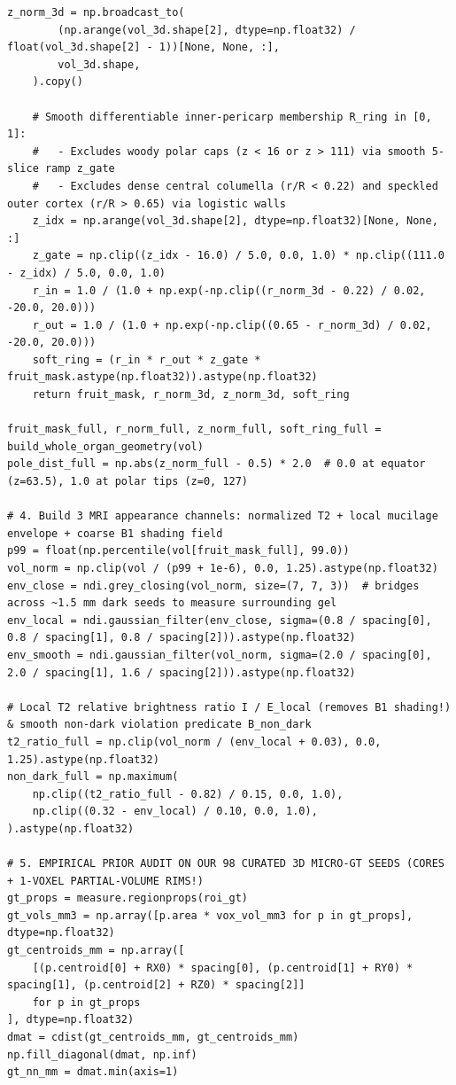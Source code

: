 \documentclass[10pt,a4paper]{article}
\begin{document}
\begin{codebox}
\begin{lstlisting}[style=pybmed]
    z_norm_3d = np.broadcast_to(
        (np.arange(vol_3d.shape[2], dtype=np.float32) / float(vol_3d.shape[2] - 1))[None, None, :],
        vol_3d.shape,
    ).copy()

    # Smooth differentiable inner-pericarp membership R_ring in [0, 1]:
    #   - Excludes woody polar caps (z < 16 or z > 111) via smooth 5-slice ramp z_gate
    #   - Excludes dense central columella (r/R < 0.22) and speckled outer cortex (r/R > 0.65) via logistic walls
    z_idx = np.arange(vol_3d.shape[2], dtype=np.float32)[None, None, :]
    z_gate = np.clip((z_idx - 16.0) / 5.0, 0.0, 1.0) * np.clip((111.0 - z_idx) / 5.0, 0.0, 1.0)
    r_in = 1.0 / (1.0 + np.exp(-np.clip((r_norm_3d - 0.22) / 0.02, -20.0, 20.0)))
    r_out = 1.0 / (1.0 + np.exp(-np.clip((0.65 - r_norm_3d) / 0.02, -20.0, 20.0)))
    soft_ring = (r_in * r_out * z_gate * fruit_mask.astype(np.float32)).astype(np.float32)
    return fruit_mask, r_norm_3d, z_norm_3d, soft_ring

fruit_mask_full, r_norm_full, z_norm_full, soft_ring_full = build_whole_organ_geometry(vol)
pole_dist_full = np.abs(z_norm_full - 0.5) * 2.0  # 0.0 at equator (z=63.5), 1.0 at polar tips (z=0, 127)

# 4. Build 3 MRI appearance channels: normalized T2 + local mucilage envelope + coarse B1 shading field
p99 = float(np.percentile(vol[fruit_mask_full], 99.0))
vol_norm = np.clip(vol / (p99 + 1e-6), 0.0, 1.25).astype(np.float32)
env_close = ndi.grey_closing(vol_norm, size=(7, 7, 3))  # bridges across ~1.5 mm dark seeds to measure surrounding gel
env_local = ndi.gaussian_filter(env_close, sigma=(0.8 / spacing[0], 0.8 / spacing[1], 0.8 / spacing[2])).astype(np.float32)
env_smooth = ndi.gaussian_filter(vol_norm, sigma=(2.0 / spacing[0], 2.0 / spacing[1], 1.6 / spacing[2])).astype(np.float32)

# Local T2 relative brightness ratio I / E_local (removes B1 shading!) & smooth non-dark violation predicate B_non_dark
t2_ratio_full = np.clip(vol_norm / (env_local + 0.03), 0.0, 1.25).astype(np.float32)
non_dark_full = np.maximum(
    np.clip((t2_ratio_full - 0.82) / 0.15, 0.0, 1.0),
    np.clip((0.32 - env_local) / 0.10, 0.0, 1.0),
).astype(np.float32)

# 5. EMPIRICAL PRIOR AUDIT ON OUR 98 CURATED 3D MICRO-GT SEEDS (CORES + 1-VOXEL PARTIAL-VOLUME RIMS!)
gt_props = measure.regionprops(roi_gt)
gt_vols_mm3 = np.array([p.area * vox_vol_mm3 for p in gt_props], dtype=np.float32)
gt_centroids_mm = np.array([
    [(p.centroid[0] + RX0) * spacing[0], (p.centroid[1] + RY0) * spacing[1], (p.centroid[2] + RZ0) * spacing[2]]
    for p in gt_props
], dtype=np.float32)
dmat = cdist(gt_centroids_mm, gt_centroids_mm)
np.fill_diagonal(dmat, np.inf)
gt_nn_mm = dmat.min(axis=1)


\end{lstlisting}
\end{codebox}
\end{document}
